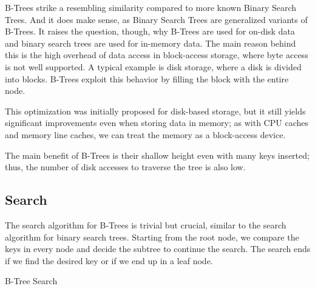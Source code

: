 
B-Trees strike a resembling similarity compared to more known Binary Search Trees. And it does make sense, as Binary Search Trees are generalized variants of B-Trees. It raises the question, though, why B-Trees are used for on-disk data and binary search trees are used for in-memory data. The main reason behind this is the high overhead of data access in block-access storage, where byte access is not well supported. A typical example is disk storage, where a disk is divided into blocks. B-Trees exploit this behavior by filling the block with the entire node.

This optimization was initially proposed for disk-based storage, but it still yields significant improvements even when storing data in memory; as with CPU caches and memory line caches, we can treat the memory as a block-access device.

The main benefit of B-Trees is their shallow height even with many keys inserted; thus, the number of disk accesses to traverse the tree is also low.

\subsection{Search}

The search algorithm for B-Trees is trivial but crucial, similar to the search algorithm for binary search trees. Starting from the root node, we compare the keys in every node and decide the subtree to continue the search. The search ends if we find the desired key or if we end up in a leaf node.

\begin{algorithm}
  \caption{B-Tree Search}\label{alg:b-tree-search}
  \DontPrintSemicolon


\end{algorithm}


